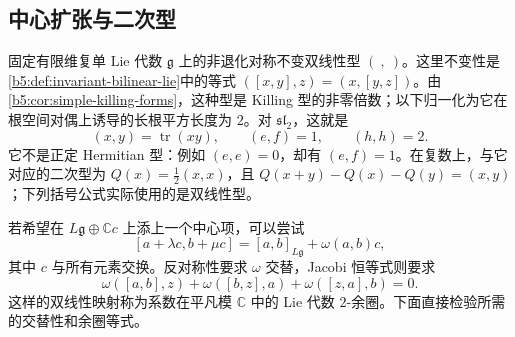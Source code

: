 \subsection{中心扩张与二次型}
\label{b5:subsec:G02:02}

固定有限维复单 Lie 代数 \(\mathfrak g\) 上的非退化对称不变双线性型 \((\ ,\ )\)。这里不变性是\cref{b5:def:invariant-bilinear-lie}中的等式 \(([x,y],z)=(x,[y,z])\)。由\cref{b5:cor:simple-killing-forms}，这种型是 Killing 型的非零倍数；以下归一化为它在根空间对偶上诱导的长根平方长度为 \(2\)。对 \(\mathfrak{sl}_2\)，这就是
\[
	(x,y)=\operatorname{tr}(xy),\qquad (e,f)=1,\qquad (h,h)=2.
\]
它不是正定 Hermitian 型：例如 \((e,e)=0\)，却有 \((e,f)=1\)。在复数上，与它对应的二次型为 \(Q(x)=\tfrac12(x,x)\)，且 \(Q(x+y)-Q(x)-Q(y)=(x,y)\)；下列括号公式实际使用的是双线性型。

\ProseParagraphBreak

若希望在 \(L\mathfrak g\oplus\mathbb Cc\) 上添上一个中心项，可以尝试
\[
	[a+\lambda c,b+\mu c]=[a,b]_{L\mathfrak g}+\omega(a,b)c,
\]
其中 \(c\) 与所有元素交换。反对称性要求 \(\omega\) 交替，Jacobi 恒等式则要求
\[
	\omega([a,b],z)+\omega([b,z],a)+\omega([z,a],b)=0.
\]
这样的双线性映射称为系数在平凡模 \(\mathbb C\) 中的 Lie 代数 \(2\)-余圈。下面直接检验所需的交替性和余圈等式。

